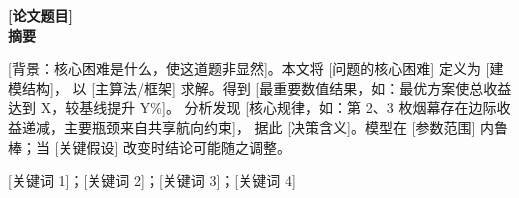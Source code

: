 \begin{center}
  {\fontsize{14pt}{16.8pt}\bfseries [论文题目]}\\[0.65em]
  {\fontsize{14pt}{16.8pt}\bfseries 摘\quad 要}
\end{center}

%
%
%
%
[背景：核心困难是什么，使这道题非显然]。本文将 [问题的核心困难] 定义为 [建模结构]，
以 [主算法/框架] 求解。得到 [最重要数值结果，如：最优方案使总收益达到 X，较基线提升 Y\%]。
分析发现 [核心规律，如：第 2、3 枚烟幕存在边际收益递减，主要瓶颈来自共享航向约束]，
据此 [决策含义]。模型在 [参数范围] 内鲁棒；当 [关键假设] 改变时结论可能随之调整。

\vspace{0.6em}

[关键词 1]；[关键词 2]；[关键词 3]；[关键词 4]

\newpage
